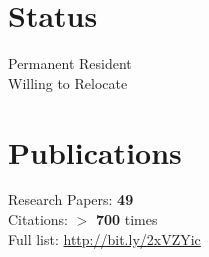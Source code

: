 \documentclass[]{junhu_resume}
\begin{document}
\begin{minipage}[t]{0.28\textwidth}

\section{Status} 
Permanent Resident\\
Willing to Relocate
\sectionsep


\section{Publications} 
Research Papers: \textbf{49}\\
Citations: $>$ \textbf{700} times\\
Full list: \href{https://scholar.google.com/citations?user=Vr8dYJsAAAAJ}{http://bit.ly/2xVZYic}










\end{minipage}
\end{document}
